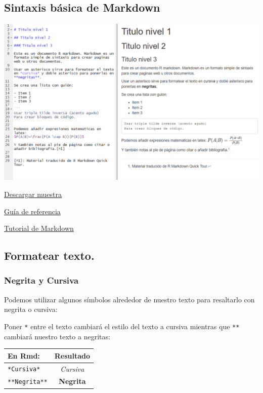\documentclass[
]{article}
\begin{document}
\hypertarget{sintaxis-buxe1sica-de-markdown}{%
\subsection{Sintaxis básica de
Markdown}\label{sintaxis-buxe1sica-de-markdown}}

\includegraphics{images/Markdown_ejemplo.PNG}

\href{ejemplos/ejemplo_markdown.Rmd}{Descargar muestra}

\href{https://rstudio.com/wp-content/uploads/2015/03/rmarkdown-reference.pdf}{Guía
de referencia}

\href{https://www.markdowntutorial.com/}{Tutorial de Markdown}

\hypertarget{formato}{%
\subsection{Formatear texto.}\label{formato}}

\hypertarget{negrita-y-cursiva}{%
\subsubsection{Negrita y Cursiva}\label{negrita-y-cursiva}}

Podemos utilizar algunos símbolos alrededor de nuestro texto para
resaltarlo con negrita o cursiva:

Poner \texttt{*} entre el texto cambiará el estilo del texto a cursiva
mientras que \texttt{**} cambiará nuestro texto a negritas:

\begin{longtable}[]{@{}lc@{}}
\toprule
En Rmd: & Resultado \\
\midrule
\endhead
\texttt{*Cursiva*} & \emph{Cursiva} \\
\texttt{**Negrita**} & \textbf{Negrita} \\
\bottomrule
\end{longtable}
\end{document}
